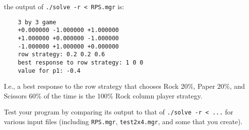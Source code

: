 \documentclass[a4paper,11pt]{article}
\begin{document}
the output of \texttt{./solve -r < RPS.mgr} is:
{\small 
\begin{verbatim}
    3 by 3 game
    +0.000000 -1.000000 +1.000000 
    +1.000000 +0.000000 -1.000000 
    -1.000000 +1.000000 +0.000000 
    row strategy: 0.2 0.2 0.6
    best response to row strategy: 1 0 0
    value for p1: -0.4
\end{verbatim}
}

I.e., a best response to the row strategy that chooses Rock 20\%, Paper 20\%,
and Scissors 60\% of the time is the 100\% Rock column player strategy.

Test your program by comparing its output to that of \texttt{./solve -r < ...} for
various input files (including \texttt{RPS.mgr}, \texttt{test2x4.mgr}, and some that you create).
\end{document}
